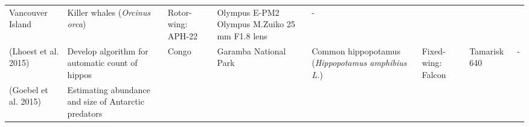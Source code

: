 \documentclass[]{interact}
\theoremstyle{plain}%
\theoremstyle{definition}
\theoremstyle{remark}
\begin{document}
\begin{longtable}[]{@{}llllllll@{}}
\begin{minipage}[t]{0.14\columnwidth}
Vancouver Island\strut
\end{minipage} & \begin{minipage}[t]{0.10\columnwidth}\raggedright\strut
Killer whales (\emph{Orcinus orca})\strut
\end{minipage} & \begin{minipage}[t]{0.09\columnwidth}\raggedright\strut
Rotor-wing: APH-22\strut
\end{minipage} & \begin{minipage}[t]{0.11\columnwidth}\raggedright\strut
Olympus E-PM2 Olympus M.Zuiko 25 mm F1.8 lens\strut
\end{minipage} & \begin{minipage}[t]{0.01\columnwidth}\raggedright\strut
-\strut
\end{minipage}\tabularnewline
\begin{minipage}[t]{0.11\columnwidth}\raggedright\strut
(Lhoest et al. 2015)\strut
\end{minipage} & \begin{minipage}[t]{0.18\columnwidth}\raggedright\strut
Develop algorithm for automatic count of hippos\strut
\end{minipage} & \begin{minipage}[t]{0.03\columnwidth}\raggedright\strut
Congo\strut
\end{minipage} & \begin{minipage}[t]{0.14\columnwidth}\raggedright\strut
Garamba National Park\strut
\end{minipage} & \begin{minipage}[t]{0.10\columnwidth}\raggedright\strut
Common hippopotamus (\emph{Hippopotamus amphibius L.})\strut
\end{minipage} & \begin{minipage}[t]{0.09\columnwidth}\raggedright\strut
Fixed-wing: Falcon\strut
\end{minipage} & \begin{minipage}[t]{0.11\columnwidth}\raggedright\strut
Tamarisk 640\strut
\end{minipage} & \begin{minipage}[t]{0.01\columnwidth}\raggedright\strut
-\strut
\end{minipage}\tabularnewline
\begin{minipage}[t]{0.11\columnwidth}\raggedright\strut
(Goebel et al. 2015)\strut
\end{minipage} & \begin{minipage}[t]{0.18\columnwidth}\raggedright\strut
Estimating abundance and size of Antarctic predators\strut

\end{minipage}
\end{longtable}
\end{document}
